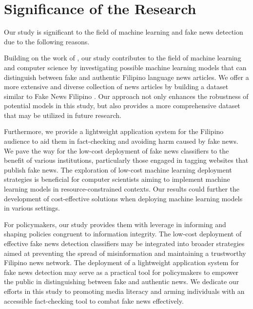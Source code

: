 \section{Significance of the Research}
\label{sec:significance}

Our study is significant to the field of machine learning and fake news detection due to the following reasons.

Building on the work of , our study contributes to the field of machine learning and computer science by investigating possible machine learning models that can distinguish between fake and authentic Filipino language news articles. We offer a more extensive and diverse collection of news articles by building a dataset similar to Fake News Filipino \cite{fake-news-filipino}. Our approach not only enhances the robustness of potential models in this study, but also provides a more comprehensive dataset that may be utilized in future research.

Furthermore, we provide a lightweight application system for the Filipino audience to aid them in fact-checking and avoiding harm caused by fake news. We pave the way for the low-cost deployment of fake news classifiers to the benefit of various institutions, particularly those engaged in tagging websites that publish fake news. The exploration of low-cost machine learning deployment strategies is beneficial for computer scientists aiming to implement machine learning models in resource-constrained contexts. Our results could further the development of cost-effective solutions when deploying machine learning models in various settings.

For policymakers, our study provides them with leverage in informing and shaping policies congruent to information integrity. The low-cost deployment of effective fake news detection classifiers may be integrated into broader strategies aimed at preventing the spread of misinformation and maintaining a trustworthy Filipino news network. The deployment of a lightweight application system for fake news detection may serve as a practical tool for policymakers to empower the public in distinguishing between fake and authentic news. We dedicate our efforts in this study to promoting media literacy and arming individuals with an accessible fact-checking tool to combat fake news effectively.
